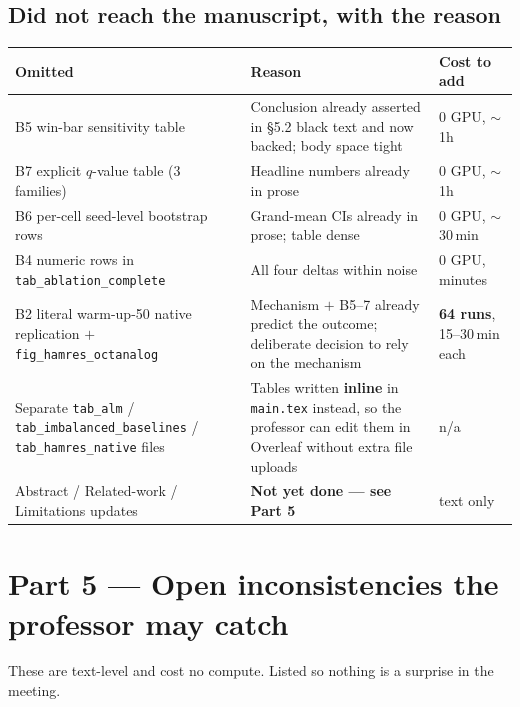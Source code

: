 \documentclass[11pt,a4paper]{article}
\begin{document}
\subsection*{Did not reach the manuscript, with the reason}

\begin{center}
\begin{tabular}{@{}p{4.9cm} p{7.2cm} p{3.1cm}@{}}
\toprule
\textbf{Omitted} & \textbf{Reason} & \textbf{Cost to add} \\
\midrule
B5 win-bar sensitivity table & Conclusion already asserted in \S5.2 black text and now backed;
  body space tight & 0 GPU, $\sim$1h \\
B7 explicit $q$-value table (3 families) & Headline numbers already in prose & 0 GPU, $\sim$1h \\
B6 per-cell seed-level bootstrap rows & Grand-mean CIs already in prose; table dense
  & 0 GPU, $\sim$30\,min \\
B4 numeric rows in \texttt{tab\_ablation\_complete} & All four deltas within noise
  & 0 GPU, minutes \\
B2 literal warm-up-50 native replication $+$ \texttt{fig\_hamres\_octanalog} &
  Mechanism $+$ B5--7 already predict the outcome; deliberate decision to rely on the mechanism &
  \textbf{64 runs}, 15--30\,min each \\
Separate \texttt{tab\_alm} / \texttt{tab\_imbalanced\_baselines} / \texttt{tab\_hamres\_native}
  files & Tables written \textbf{inline} in \texttt{main.tex} instead, so the professor can edit
  them in Overleaf without extra file uploads & n/a \\
Abstract / Related-work / Limitations updates & \textcolor{warnred}{\textbf{Not yet done ---
  see Part 5}} & text only \\
\bottomrule
\end{tabular}
\end{center}

\section*{Part 5 --- Open inconsistencies the professor may catch}

These are text-level and cost no compute. Listed so nothing is a surprise in the meeting.
\end{document}
